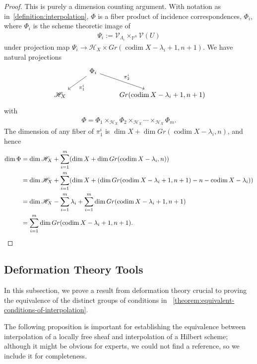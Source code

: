 \documentclass[reqno, 11pt]{amsart}
\theoremstyle{definition}
\theoremstyle{remark}
\numberwithin{equation}{section}
\numberwithin{thm}{section}
\numberwithin{prop}{section}
\numberwithin{lem}{section}
\numberwithin{cor}{section}
\numberwithin{conj}{section}
\numberwithin{defn}{section}
\theoremstyle{plain}
\theoremstyle{definition}
\newcommand\ssec{\subsection}
\newcommand\sch{\mathscr H}
\newcommand\scv{\mathscr V}
\newcommand \ra{\rightarrow}
\newcommand \hilb[1]{\sch_{#1}}
\newcommand \uhilb[1]{\scv_{#1}}
\DeclareMathOperator\codim{codim}
\begin{document}
\begin{proof}
	This is purely a dimension counting argument. With notation as in~\autoref{definition:interpolation}, $\Phi$ is a fiber product
	of incidence correspondences, $\Phi_i$, where $\Phi_i$ is the scheme theoretic image of
	\begin{align*}
		\Psi_i := \uhilb {\Lambda_i} \times_{\mathbb P^n} \scv(U)
	\end{align*}
	under projection map $\Psi_i \ra \hilb X \times Gr(\codim X - \lambda_i + 1, n+1).$
	We have natural projections
	\begin{equation}
		\nonumber
		\begin{tikzcd}
			\qquad & \Phi_i \ar {ld}{\pi^i_1} \ar {rd}{\pi^i_2} & \\
			 \hilb X && Gr(\codim X -\lambda_i + 1, n+1)
		 \end{tikzcd}\end{equation}
	with
	\begin{align*}
		\Phi = \Phi_1 \times_{\hilb X} \Phi_2 \times_{\hilb X} \cdots \times_{\hilb X} \Phi_m.
	\end{align*}
	The dimension of any fiber of $\pi_1^i$ is $\dim X + \dim Gr(\codim X-\lambda_i, n)$, and hence
	\begin{align*}
		\dim \Phi &= \dim \hilb X + \sum_{i=1}^m (\dim X + \dim Gr(\codim X-\lambda_i, n)) \\
		&= \dim \hilb X + \sum_{i=1}^m (\dim X + (\dim Gr(\codim X-\lambda_i + 1, n + 1) - n-\codim X - \lambda_i)) \\
		&= \dim \hilb X - \sum_{i=1}^m \lambda_i + \sum_{i=1}^m \dim Gr(\codim X-\lambda_i + 1, n + 1) \\
		&= \sum_{i=1}^m \dim Gr(\codim X-\lambda_i + 1, n + 1).\qedhere 
	\end{align*}
\end{proof}

\ssec{Deformation Theory Tools}
\label{ssec:tools-additional}


In this subsection, we prove a result from
deformation theory crucial to proving
the equivalence of the distinct groups of conditions in
~\autoref{theorem:equivalent-conditions-of-interpolation}.


The following proposition is important for establishing
the equivalence between interpolation of
a locally free sheaf and interpolation of a Hilbert scheme; although it might be obvious for experts, we could not find a reference, so we include it for completeness.
\end{document}
